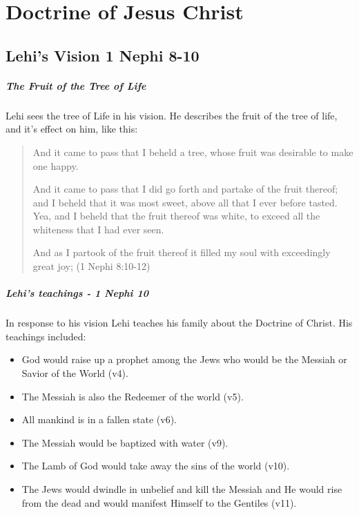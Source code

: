 \chapter{Doctrine of Jesus Christ}

\section{Lehi's Vision 1 Nephi 8-10}

\paragraph{The Fruit of the Tree of Life}
Lehi sees the tree of Life in his vision. He describes the fruit of the tree of life, and it's effect on him, like this:

\begin{quotation}
And it came to pass that I beheld a tree, whose fruit was desirable to make one happy.

And it came to pass that I did go forth and partake of the fruit thereof; and I beheld that it was most sweet, above all that I ever before tasted. Yea, and I beheld that the fruit thereof was white, to exceed all the whiteness that I had ever seen.

And as I partook of the fruit thereof it filled my soul with exceedingly great joy; (1 Nephi 8:10-12)
\end{quotation}

\paragraph{Lehi's teachings - 1 Nephi 10}
In response to his vision Lehi teaches his family about the Doctrine of Christ. His teachings included:

\begin{itemize}
  \item{God would raise up a prophet among the Jews who would be the Messiah or Savior of the World (v4).}
  \item{The Messiah is also the Redeemer of the world (v5).}
  \item{All mankind is in a fallen state (v6).}
  \item{The Messiah would be baptized with water (v9).}
  \item{The Lamb of God would take away the sins of the world (v10).}
  \item{The Jews would dwindle in unbelief and kill the Messiah and He would rise from the dead and would manifest Himself to the Gentiles (v11).}
\end{itemize}

